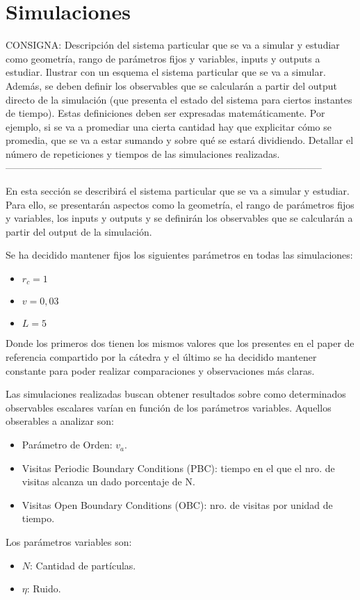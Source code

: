 \documentclass[11pt]{article}
\begin{document}
    \section{Simulaciones}
        \hrulefill\newline
        CONSIGNA:
        Descripción del sistema particular que se va a simular y estudiar como
        geometría, rango de parámetros fijos y variables, inputs y outputs a estudiar. Ilustrar con un
        esquema el sistema particular que se va a simular.
        Además, se deben definir los observables que se calcularán a partir del output directo de la
        simulación (que presenta el estado del sistema para ciertos instantes de tiempo). Estas
        definiciones deben ser expresadas matemáticamente. Por ejemplo, si se va a promediar una cierta
        cantidad hay que explicitar cómo se promedia, que se va a estar sumando y sobre qué se estará
        dividiendo.
        Detallar el número de repeticiones y tiempos de las simulaciones realizadas.
        --------------------------------------------------------------------------------------------------
        \newline

        En esta sección se describirá el sistema particular que se va a simular y estudiar. Para ello, se
        presentarán aspectos como la geometría, el rango de parámetros fijos y variables, los inputs y outputs
        y se definirán los observables que se calcularán a partir del output de la simulación.

        Se ha decidido mantener fijos los siguientes parámetros en todas las simulaciones:
        \begin{itemize}
            \item $r_c = 1$
            \item $v = 0,03$
            \item $L = 5$
        \end{itemize}
        Donde los primeros dos tienen los mismos valores que los presentes en el paper de referencia
        compartido por la cátedra y el último se ha decidido mantener constante para poder realizar comparaciones
        y observaciones más claras.

        Las simulaciones realizadas buscan obtener resultados sobre como determinados observables escalares varían
        en función de los parámetros variables. Aquellos obserables a analizar son:
        \begin{itemize}
            \item Parámetro de Orden: $v_a$.
            \item Visitas Periodic Boundary Conditions (PBC): tiempo en el que el nro. de visitas alcanza un dado porcentaje de N.
            \item Visitas Open Boundary Conditions (OBC): nro. de visitas por unidad de tiempo.
        \end{itemize}
        Los parámetros variables son:
        \begin{itemize}
            \item $N$: Cantidad de partículas.
            \item $\eta$: Ruido.
        \end{itemize}
\end{document}
